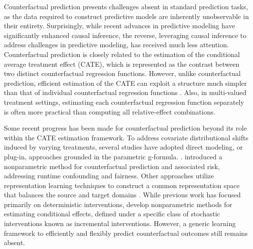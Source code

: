 Counterfactual prediction presents challenges absent in standard prediction tasks, as the data required to construct predictive models are inherently unobservable in their entirety. Surprisingly, while recent advances in predictive modeling have significantly enhanced causal inference, the reverse, leveraging causal inference to address challenges in predictive modeling, has received much less attention. Counterfactual prediction is closely related to the estimation of the conditional average treatment effect (CATE), which is represented as the contrast between two distinct counterfactual regression functions. However, unlike counterfactual prediction, efficient estimation of the CATE can exploit a structure much simpler than that of individual counterfactual regression functions \citep{kennedy2020optimal}. Also, in multi-valued treatment settings, estimating each counterfactual regression function separately is often more practical than computing all relative-effect combinations.

Some recent progress has been made for counterfactual prediction beyond its role within the CATE estimation framework. To address covariate distributional shifts induced by varying treatments, several studies have adopted direct modeling, or plug-in, approaches grounded in the parametric g-formula. \citep[e.g.,][]{li2016predictive, schulam2017reliable,nguyen2020counterfactual, lin2021scoping,dickerman2022predicting}. \citet{coston2020RuntimeConfounding, coston2020counterfactual} introduced a nonparametric method for counterfactual prediction and associated risk, addressing runtime confounding and fairness. Other approaches utilize representation learning techniques to construct a common representation space that balances the source and target domains \citep[e.g.,][]{johansson2016learning, shalit2017estimating, hassanpour2019counterfactual, hassanpour2019learning}. While previous work has focused primarily on deterministic interventions, \citet{mcclean2024nonparametric} develop nonparametric methods for estimating conditional effects, defined under a specific class of stochastic interventions known as incremental interventions. However, a generic learning framework to efficiently and flexibly predict counterfactual outcomes still remains absent. 

